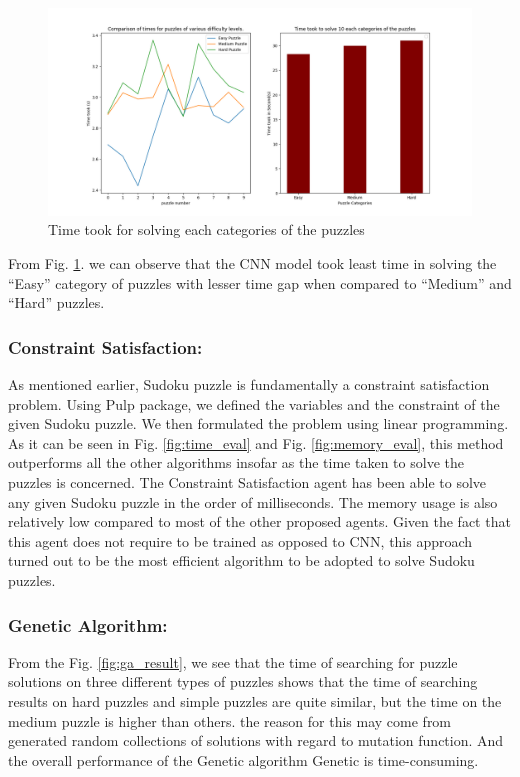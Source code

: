 \begin{figure} [htbp]
\centering
\includegraphics[width=120mm,scale=1.5]{figures/CNN_Analysis.png}
\caption{Time took for solving each categories of the puzzles}
\label{fig:cnn_difficulty_levels}
\end{figure}

From Fig. \ref{fig:cnn_difficulty_levels}. we can observe that the CNN model took least time in solving the “Easy” category of puzzles with lesser time gap when compared to “Medium” and “Hard” puzzles.

\subsubsection{Constraint Satisfaction:}
As mentioned earlier, Sudoku puzzle is fundamentally a constraint satisfaction problem. Using Pulp package, we defined the variables and the constraint of the given Sudoku puzzle. We then formulated the problem using linear programming. As it can be seen in Fig. \ref{fig:time_eval} and Fig. \ref{fig:memory_eval}, this method outperforms all the other algorithms insofar as the time taken to solve the puzzles is concerned. The Constraint Satisfaction agent has been able to solve any given Sudoku puzzle in the order of milliseconds. The memory usage is also relatively low compared to most of the other proposed agents. Given the fact that this agent does not require to be trained as opposed to CNN, this approach turned out to be the most efficient algorithm to be adopted to solve Sudoku puzzles.

\subsubsection{Genetic Algorithm:}

From the Fig. \ref{fig:ga_result}, we see that the time of searching for puzzle solutions on three different types of puzzles shows that the time of searching results on hard puzzles and simple puzzles are quite similar, but the time on the medium puzzle is higher than others. the reason for this may come from generated random collections of solutions with regard to mutation function. And the overall performance of the Genetic algorithm Genetic is time-consuming.


